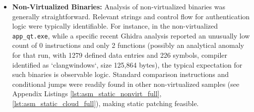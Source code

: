 \begin{itemize}
	\item \textbf{Non-Virtualized Binaries:} Analysis of non-virtualized binaries was generally straightforward. Relevant strings and control flow for authentication logic were typically identifiable. For instance, in the non-virtualized \texttt{app\_qt.exe}, while a specific recent Ghidra analysis reported an unusually low count of 0 instructions and only 2 functions (possibly an analytical anomaly for that run, with 1279 defined data entries and 226 symbols, compiler identified as `clangwindows`, size 125,864 bytes), the typical expectation for such binaries is observable logic. Standard comparison instructions and conditional jumps were readily found in other non-virtualized samples (see Appendix Listings \ref{lst:asm_static_nonvirt_full}, \ref{lst:asm_static_cloud_full}), making static patching feasible.


\end{itemize}
